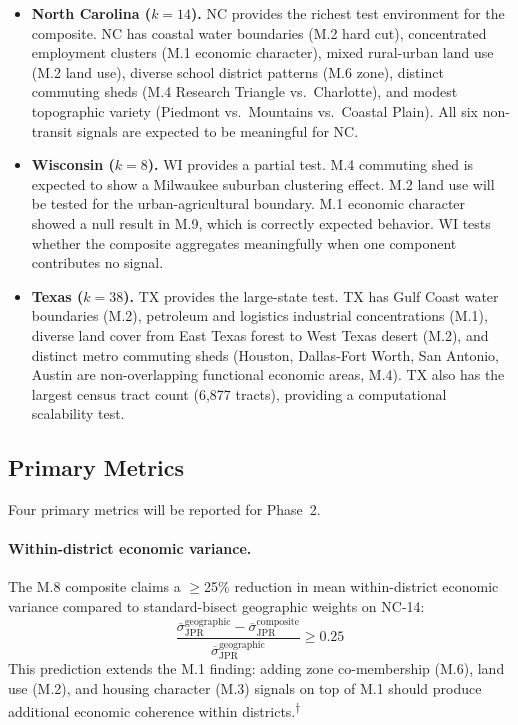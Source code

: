 \begin{itemize}
  \item \textbf{North Carolina ($k=14$).}
    NC provides the richest test environment for the composite.
    NC has coastal water boundaries (M.2 hard cut), concentrated employment
    clusters (M.1 economic character), mixed rural-urban land use (M.2 land use),
    diverse school district patterns (M.6 zone), distinct commuting sheds
    (M.4 Research Triangle vs.\ Charlotte), and modest topographic variety
    (Piedmont vs.\ Mountains vs.\ Coastal Plain).
    All six non-transit signals are expected to be meaningful for NC.
  \item \textbf{Wisconsin ($k=8$).}
    WI provides a partial test.
    M.4 commuting shed is expected to show a Milwaukee suburban clustering effect.
    M.2 land use will be tested for the urban-agricultural boundary.
    M.1 economic character showed a null result in M.9, which is correctly
    expected behavior.
    WI tests whether the composite aggregates meaningfully when one component
    contributes no signal.
  \item \textbf{Texas ($k=38$).}
    TX provides the large-state test.
    TX has Gulf Coast water boundaries (M.2), petroleum and logistics
    industrial concentrations (M.1), diverse land cover from East Texas
    forest to West Texas desert (M.2), and distinct metro commuting sheds
    (Houston, Dallas-Fort Worth, San Antonio, Austin are non-overlapping
    functional economic areas, M.4).
    TX also has the largest census tract count (6,877 tracts), providing
    a computational scalability test.
\end{itemize}

\subsection{Primary Metrics}

Four primary metrics will be reported for Phase~2.

\paragraph{Within-district economic variance.}
The M.8 composite claims a $\geq$25\% reduction in mean within-district
economic variance compared to standard-bisect geographic weights on NC-14:
\begin{equation}
  \frac{\overline{\sigma}_{\mathrm{JPR}}^{\mathrm{geographic}} -
        \overline{\sigma}_{\mathrm{JPR}}^{\mathrm{composite}}}
       {\overline{\sigma}_{\mathrm{JPR}}^{\mathrm{geographic}}}
  \geq 0.25
  \label{eq:variance-reduction}
\end{equation}
This prediction extends the M.1 finding: adding zone co-membership (M.6),
land use (M.2), and housing character (M.3) signals on top of M.1 should
produce additional economic coherence within districts.\textsuperscript{$\dagger$}

